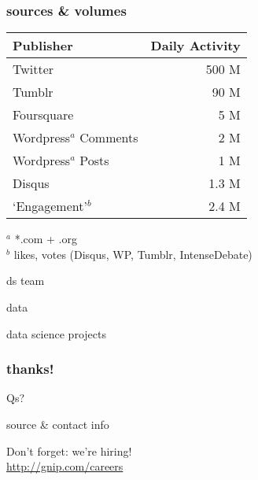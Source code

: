 \documentclass{beamer}
\begin{document}

\begin{frame} \frametitle{sources \& volumes}


\begin{table}
	\begin{tabular}{l|r}
		\hline
		{Publisher}   					&   	{Daily Activity} \\
		\hline 
		Twitter      					&	500 M \\
		Tumblr      					&	90 M \\
		Foursquare      					&	5 M \\
		Wordpress$^{a}$ Comments 		&	2 M \\
		Wordpress$^{a}$ Posts 			&	1 M \\
		Disqus       					&	1.3 M \\
		`Engagement'$^{b}$ 			&	2.4 M \\
		\hline
	\end{tabular}
\end{table}
${}^a$ *.com + .org \\
${}^b$ likes, votes (Disqus, WP, Tumblr, IntenseDebate)

\end{frame}



\begin{frame}
ds team
\end{frame}


\begin{frame}
data
\end{frame}


\begin{frame}
data science projects
\end{frame}


\begin{frame} \frametitle{thanks!}

\vspace{0.5in}

\begin{center}
\Huge{Qs?}

\vspace{0.5in}

\normalsize{source \& contact info}

\vspace{0.5in}

\Large{Don't forget: we're hiring!} \\
\url{http://gnip.com/careers}
\end{center}

\end{frame}
\end{document}

